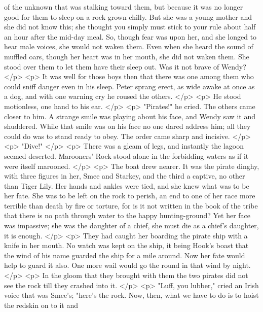       of the unknown that was stalking toward them, but because it was no longer
      good for them to sleep on a rock grown chilly. But she was a young mother
      and she did not know this; she thought you simply must stick to your rule
      about half an hour after the mid-day meal. So, though fear was upon her,
      and she longed to hear male voices, she would not waken them. Even when
      she heard the sound of muffled oars, though her heart was in her mouth,
      she did not waken them. She stood over them to let them have their sleep
      out. Was it not brave of Wendy?
    </p>
    <p>
      It was well for those boys then that there was one among them who could
      sniff danger even in his sleep. Peter sprang erect, as wide awake at once
      as a dog, and with one warning cry he roused the others.
    </p>
    <p>
      He stood motionless, one hand to his ear.
    </p>
    <p>
      "Pirates!" he cried. The others came closer to him. A strange smile was
      playing about his face, and Wendy saw it and shuddered. While that smile
      was on his face no one dared address him; all they could do was to stand
      ready to obey. The order came sharp and incisive.
    </p>
    <p>
      "Dive!"
    </p>
    <p>
      There was a gleam of legs, and instantly the lagoon seemed deserted.
      Marooners' Rock stood alone in the forbidding waters as if it were itself
      marooned.
    </p>
    <p>
      The boat drew nearer. It was the pirate dinghy, with three figures in her,
      Smee and Starkey, and the third a captive, no other than Tiger Lily. Her
      hands and ankles were tied, and she knew what was to be her fate. She was
      to be left on the rock to perish, an end to one of her race more terrible
      than death by fire or torture, for is it not written in the book of the
      tribe that there is no path through water to the happy hunting-ground? Yet
      her face was impassive; she was the daughter of a chief, she must die as a
      chief's daughter, it is enough.
    </p>
    <p>
      They had caught her boarding the pirate ship with a knife in her mouth. No
      watch was kept on the ship, it being Hook's boast that the wind of his
      name guarded the ship for a mile around. Now her fate would help to guard
      it also. One more wail would go the round in that wind by night.
    </p>
    <p>
      In the gloom that they brought with them the two pirates did not see the
      rock till they crashed into it.
    </p>
    <p>
      "Luff, you lubber," cried an Irish voice that was Smee's; "here's the
      rock. Now, then, what we have to do is to hoist the redskin on to it and
